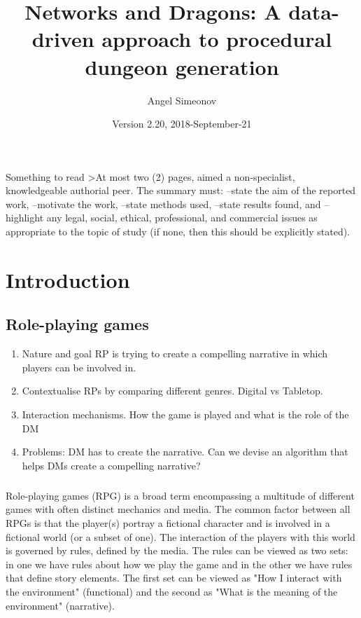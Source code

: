 \documentclass{UoYCSproject}
\author{Angel Simeonov}
\title{Networks and Dragons: A data-driven approach to procedural dungeon generation}
\date{Version 2.20, 2018-September-21}
\begin{document}
\maketitle
\listoffigures
\listoftables

\begin{summary}
Something to read \parencite{zobel2015writing}
>At most two (2) pages, aimed a non-specialist, knowledgeable authorial peer.
The summary must:
--state the aim of the reported work,
--motivate the work,
--state methods used,
--state results found, and
--highlight any legal, social, ethical, professional, and commercial issues as appropriate to the topic of study (if none, then this should be explicitly stated).
\end{summary}

\chapter{Introduction}
\label{cha:Introduction}

\section{Role-playing games}
\begin{enumerate}
  \item Nature and goal  RP is trying to create a compelling narrative in which players can be involved in.
    \item Contextualise RPs by comparing different genres. Digital vs Tabletop.
  \item Interaction mechanisms. How the game is played and what is the role of the DM
  \item Problems: DM has to create the narrative. Can we devise an algorithm that helps DMs create a compelling narrative?
\end{enumerate}

\paragraph{}
Role-playing games (RPG) is a broad term encompassing a multitude of different games with often distinct mechanics and media. The common factor between all RPGs is that the player(s) portray a fictional character and is involved in a fictional world (or a subset of one). The interaction of the players with this world is governed by rules, defined by the media. The rules can be viewed as two sets: in one we have rules about how we play the game and in the other we have rules that define story elements. The first set can be viewed as "How I interact with the environment" (functional) and the second as "What is the meaning of the environment" (narrative). 
\end{document}
